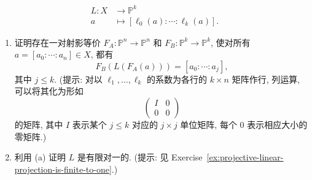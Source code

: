 \begin{BookExercises}
  \[
    \begin{aligned}
      L:X&\to\mathbb{P}^{k}\\
      a&\mapsto[\ell_{0}(a):\cdots:\ell_{k}(a)].
    \end{aligned}
  \]
  \begin{enumerate}
    \item 证明存在一对射影等价 $F_{A}:\mathbb{P}^{n}\to\mathbb{P}^{n}$ 和 $F_{B}:\mathbb{P}^{k}\to\mathbb{P}^{k}$, 使对所有 $a=[a_{0}:\cdots:a_{n}]\in X$, 都有
    \[
      F_{B}(L(F_{A}(a)))=[a_{0}:\cdots:a_{j}],
    \]
    其中 $j\le k$. (提示: 对以 $\ell_{1},\ldots,\ell_{k}$ 的系数为各行的 $k\times n$ 矩阵作行, 列运算, 可以将其化为形如
    \[
      \begin{pmatrix}
        I&0\\
        0&0
      \end{pmatrix}
    \]
    的矩阵, 其中 $I$ 表示某个 $j\le k$ 对应的 $j\times j$ 单位矩阵, 每个 $0$ 表示相应大小的零矩阵.)
    \item 利用 (a) 证明 $L$ 是有限对一的. (提示: 见 Exercise~\ref{ex:projective-linear-projection-is-finite-to-one}.)
  \end{enumerate}
\end{BookExercises}
